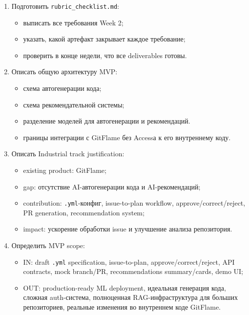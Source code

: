 \documentclass[12pt,a4paper]{article}
\begin{document}
\begin{enumerate}
    \item Подготовить \texttt{rubric\_checklist.md}:
    \begin{itemize}
        \item выписать все требования Week 2;
        \item указать, какой артефакт закрывает каждое требование;
        \item проверить в конце недели, что все deliverables готовы.
    \end{itemize}

    \item Описать общую архитектуру MVP:
    \begin{itemize}
        \item схема автогенерации кода;
        \item схема рекомендательной системы;
        \item разделение моделей для автогенерации и рекомендаций.
        \item границы интеграции с GitFlame без Accessа к его внутреннему коду.
    \end{itemize}

    \item Описать Industrial track justification:
    \begin{itemize}
        \item existing product: GitFlame;
        \item gap: отсутствие AI-автогенерации кода и AI-рекомендаций;
        \item contribution: \texttt{.yml}-конфиг, issue-to-plan workflow, approve/correct/reject, PR generation, recommendation system;
        \item impact: ускорение обработки issue и улучшение анализа репозитория.
    \end{itemize}

    \item Определить MVP scope:
    \begin{itemize}
        \item IN: draft \texttt{.yml} specification, issue-to-plan, approve/correct/reject, API contracts, mock branch/PR, recommendations summary/cards, demo UI;
        \item OUT: production-ready ML deployment, идеальная генерация кода, сложная auth-система, полноценная RAG-инфраструктура для больших репозиториев, реальные изменения во внутреннем коде GitFlame.
    \end{itemize}


\end{enumerate}
\end{document}
